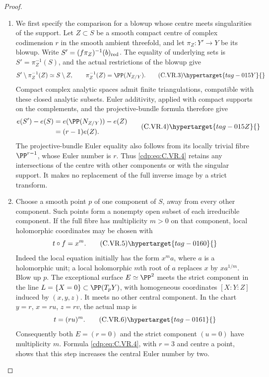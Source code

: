 \begin{proof}

\begin{enumerate}[label={$\langle1\rangle$\arabic*.},leftmargin=*]
\item We first specify the comparison for a blowup whose centre meets
singularities of the support. Let $Z\subset S$ be a smooth compact
centre of complex codimension $r$ in the smooth ambient threefold,
and let $\pi_Z:Y'\to Y$ be its blowup. Write $S'=(f\pi_Z)^{-1}(b)_{\rm red}$.
The equality of underlying sets is $S'=\pi_Z^{-1}(S)$, and the actual
restrictions of the blowup give
\[
 S'\setminus\pi_Z^{-1}(Z)\simeq S\setminus Z,
 \qquad \pi_Z^{-1}(Z)=\PP(N_{Z/Y}).                \tag{C.VR.3}\hypertarget{tag-015Y}{}\label{cdp:eq:C.VR.3}
\]
Compact complex analytic spaces admit finite triangulations, compatible
with these closed analytic subsets. Euler additivity, applied with
compact supports on the complements, and the projective-bundle
formula therefore give
\[
 \begin{split}
 e(S')-e(S)
 &=e(\PP(N_{Z/Y}))-e(Z)\\
 &=(r-1)e(Z).
 \end{split}                                      \tag{C.VR.4}\hypertarget{tag-015Z}{}\label{cdp:eq:C.VR.4}
\]
The projective-bundle Euler equality also follows from its locally
trivial fibre $\PP^{r-1}$, whose Euler number is $r$.
Thus \eqref{cdp:eq:C.VR.4} retains any intersections of the centre with other
components or with the singular support. It makes no replacement of
the full inverse image by a strict transform.

\item Choose a smooth point $p$ of one component of $S$, away from every
other component. Such points form a nonempty open subset of each
irreducible component. If the full fibre has multiplicity $m>0$ on
that component, local holomorphic coordinates may be chosen with
\[
                    t\circ f=x^m.                \tag{C.VR.5}\hypertarget{tag-0160}{}\label{cdp:eq:C.VR.5}
\]
Indeed the local equation initially has the form $x^m a$, where $a$
is a holomorphic unit; a local holomorphic $m$th root of $a$ replaces
$x$ by $x a^{1/m}$. Blow up $p$. The exceptional surface
$E\simeq\PP^2$ meets the strict component in the line
$L=\{X=0\}\subset\PP(T_pY)$, with homogeneous coordinates
$[X:Y:Z]$ induced by $(x,y,z)$. It meets no other central component.
In the chart $y=r$, $x=ru$, $z=rv$, the actual map is
\[
                         t=(ru)^m.                \tag{C.VR.6}\hypertarget{tag-0161}{}\label{cdp:eq:C.VR.6}
\]
Consequently both $E=(r=0)$ and the strict component $(u=0)$
have multiplicity $m$. Formula \eqref{cdp:eq:C.VR.4}, with $r=3$ and centre a
point, shows that this step increases the central Euler number by two.


\end{enumerate}
\end{proof}
